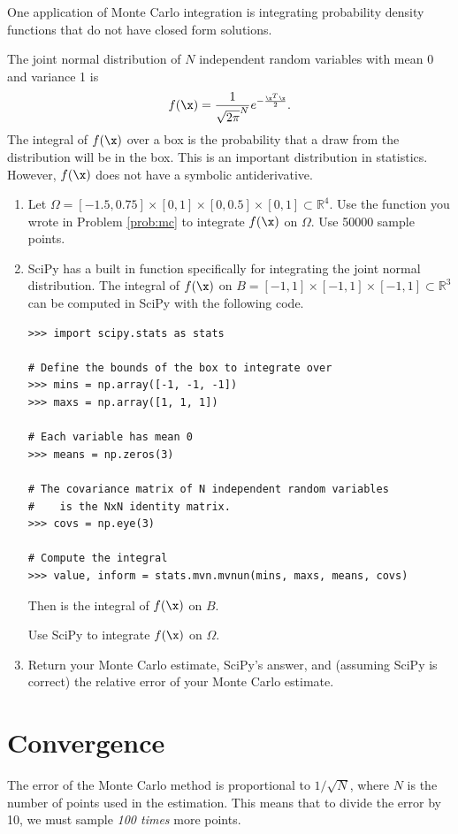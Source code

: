 One application of Monte Carlo integration is integrating probability density functions that do not have closed form solutions.

\begin{problem}
The joint normal distribution of $N$ independent random variables with mean 0 and variance 1 is
\[
f(\x) = \frac{1}{\sqrt{2 \pi}^N} e^{- \frac{\x^T\x}{2}}.
\]
The integral of $f(\x)$ over a box is the probability that a draw from the distribution will be in the box.
This is an important distribution in statistics.
However, $f(\x)$ does not have a symbolic antiderivative.
\begin{enumerate}
\item Let $\Omega=[-1.5, 0.75]\times[0,1]\times[0, 0.5]\times[0,1] \subset \mathbb{R}^4$.
Use the function you wrote in Problem \ref{prob:mc} to integrate $f(\x)$ on $\Omega$.
Use 50000 sample points.
\item SciPy has a built in function specifically for integrating the joint normal distribution.
The integral of $f(\x)$ on $B = [-1,1]\times [-1,1]\times[-1,1] \subset \mathbb{R}^3$ can be computed in SciPy with the following code.
\begin{lstlisting}
>>> import scipy.stats as stats

# Define the bounds of the box to integrate over
>>> mins = np.array([-1, -1, -1])
>>> maxs = np.array([1, 1, 1])

# Each variable has mean 0
>>> means = np.zeros(3)

# The covariance matrix of N independent random variables
#    is the NxN identity matrix.
>>> covs = np.eye(3)

# Compute the integral
>>> value, inform = stats.mvn.mvnun(mins, maxs, means, covs)
\end{lstlisting}
Then  is the integral of $f(\x)$ on $B$.

Use SciPy to integrate $f(\x)$ on $\Omega$. 


\item Return your Monte Carlo estimate, SciPy's answer, and (assuming SciPy is correct) the relative error of your Monte Carlo estimate.
\end{enumerate}
\end{problem}

\section*{Convergence}

The error of the Monte Carlo method is proportional to $1/\sqrt{N}$, where $N$ is the number of points used in the estimation.
This means that to divide the error by 10, we must sample \emph{100 times} more points.

